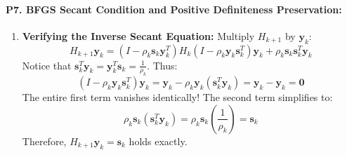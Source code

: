 \paragraph{P7. BFGS Secant Condition and Positive Definiteness Preservation:}
\begin{enumerate}[label=(\alph*)]
    \item \textbf{Verifying the Inverse Secant Equation:}
    Multiply $H_{k+1}$ by $\mathbf{y}_k$:
    \begin{equation*}
    H_{k+1} \mathbf{y}_k = \left( I - \rho_k \mathbf{s}_k \mathbf{y}_k^T \right) H_k \left( I - \rho_k \mathbf{y}_k \mathbf{s}_k^T \right) \mathbf{y}_k + \rho_k \mathbf{s}_k \mathbf{s}_k^T \mathbf{y}_k
    \end{equation*}
    Notice that $\mathbf{s}_k^T \mathbf{y}_k = \mathbf{y}_k^T \mathbf{s}_k = \frac{1}{\rho_k}$. Thus:
    \begin{equation*}
    \left( I - \rho_k \mathbf{y}_k \mathbf{s}_k^T \right) \mathbf{y}_k = \mathbf{y}_k - \rho_k \mathbf{y}_k (\mathbf{s}_k^T \mathbf{y}_k) = \mathbf{y}_k - \mathbf{y}_k = \mathbf{0}
    \end{equation*}
    The entire first term vanishes identically! The second term simplifies to:
    \begin{equation*}
    \rho_k \mathbf{s}_k (\mathbf{s}_k^T \mathbf{y}_k) = \rho_k \mathbf{s}_k \left( \frac{1}{\rho_k} \right) = \mathbf{s}_k
    \end{equation*}
    Therefore, $H_{k+1} \mathbf{y}_k = \mathbf{s}_k$ holds exactly.


\end{enumerate}
